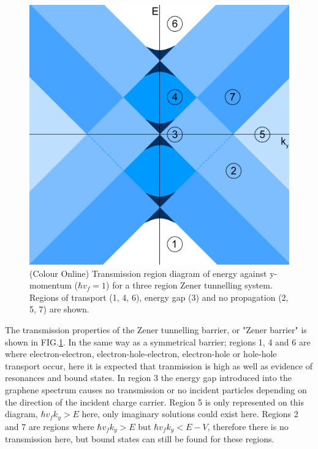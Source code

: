 \documentclass[prl,twocolumn,aps,superscriptaddress,floatfix,10pt]{revtex4}
\begin{document}
\begin{figure}
	\includegraphics[scale=0.2]{double-step-regions-flat}
	\caption{(Colour Online) Transmission region diagram of energy against y-momentum ($\hbar v_{f}=1$) for a three region Zener tunnelling system. Regions of transport (1, 4, 6), energy gap (3) and no propagation (2, 5, 7) are shown.}
	\label{double-step-regions-flat}
\end{figure}

	The transmission properties of the Zener tunnelling barrier, or "Zener barrier" is shown in FIG.\ref{double-step-regions-flat}. In the same way as a symmetrical barrier; regions 1, 4 and 6 are where electron-electron, electron-hole-electron, electron-hole or hole-hole transport occur, here it is expected that tranmission is high as well as evidence of resonances and bound states. In region 3 the energy gap introduced into the graphene spectrum causes no transmission or no incident particles depending on the direction of the incident charge carrier. Region 5 is only represented on this diagram, $\hbar v_{f} k_{y}>E$ here, only imaginary solutions could exist here. Regions 2 and 7 are regions where $\hbar v_{f} k_{y}>E$ but  $\hbar v_{f} k_{y}<E-V$, therefore there is no transmission here, but bound states can still be found for these regions.
\end{document}
